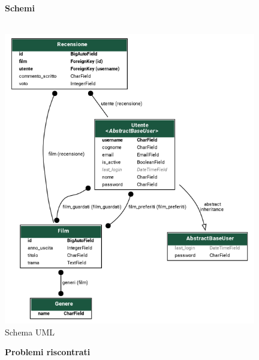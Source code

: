 \documentclass[12pt]{article}
\begin{document}
	\pagebreak
	
	
	\noindent \centerline {\Huge \textbf{Schemi}} \\
	\centering \includegraphics[width=11cm, ]{Immagini/streamify.png} \\
	\centering Schema UML
	
	\pagebreak
	
	
	\noindent \centerline {\Huge \textbf{Problemi riscontrati}} \\
	
	
	
	
\end{document}

